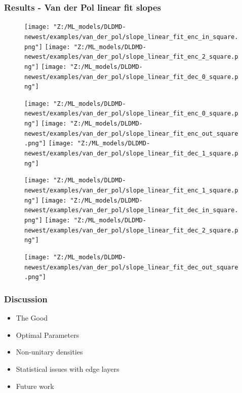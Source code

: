 \documentclass[11pt,aspectratio=169]{beamer}
\begin{document}
    \begin{frame}
        \frametitle{Results - Van der Pol linear fit slopes} 
        \begin{figure}
            \centering
            \begin{minipage}{.3333\textwidth}
                \texttt{[image: "Z:/ML\_models/DLDMD-newest/examples/van\_der\_pol/slope\_linear\_fit\_enc\_in\_square.png"]}
                \texttt{[image: "Z:/ML\_models/DLDMD-newest/examples/van\_der\_pol/slope\_linear\_fit\_enc\_2\_square.png"]}
                \texttt{[image: "Z:/ML\_models/DLDMD-newest/examples/van\_der\_pol/slope\_linear\_fit\_dec\_0\_square.png"]}
            \end{minipage}%
            \begin{minipage}{.3333\textwidth}
                \texttt{[image: "Z:/ML\_models/DLDMD-newest/examples/van\_der\_pol/slope\_linear\_fit\_enc\_0\_square.png"]}
                \texttt{[image: "Z:/ML\_models/DLDMD-newest/examples/van\_der\_pol/slope\_linear\_fit\_enc\_out\_square.png"]}
                \texttt{[image: "Z:/ML\_models/DLDMD-newest/examples/van\_der\_pol/slope\_linear\_fit\_dec\_1\_square.png"]}
            \end{minipage}%
            \begin{minipage}{.3333\textwidth}
                \texttt{[image: "Z:/ML\_models/DLDMD-newest/examples/van\_der\_pol/slope\_linear\_fit\_enc\_1\_square.png"]}
                \texttt{[image: "Z:/ML\_models/DLDMD-newest/examples/van\_der\_pol/slope\_linear\_fit\_dec\_in\_square.png"]}
                \texttt{[image: "Z:/ML\_models/DLDMD-newest/examples/van\_der\_pol/slope\_linear\_fit\_dec\_2\_square.png"]}
            \end{minipage}
            \texttt{[image: "Z:/ML\_models/DLDMD-newest/examples/van\_der\_pol/slope\_linear\_fit\_dec\_out\_square.png"]}
        \end{figure}
    \end{frame}



    \begin{frame}
        \frametitle{Discussion}
        \begin{itemize}
            \item The Good \vspace{1cm}
            \item Optimal Parameters \vspace{1cm}
            \item Non-unitary densities \vspace{1cm}
            \item Statistical issues with edge layers \vspace{1cm}
            \item Future work
        \end{itemize}

    \end{frame}
\end{document}
